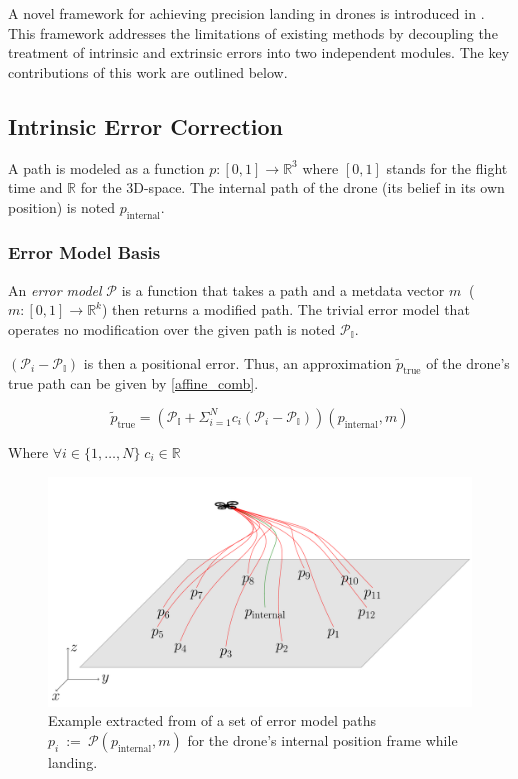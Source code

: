 \documentclass[10pt,journal,compsoc]{IEEEtran}
\begin{document}
 A novel framework for achieving precision landing in drones is introduced in \cite{studied}. This framework addresses the limitations of existing methods by decoupling the treatment of intrinsic and extrinsic errors into two independent modules. The key contributions of this work are outlined below.

\subsection{Intrinsic Error Correction}
A path is modeled as a function $p : [0,1] \to \mathbb{R}^3$ where $[0,1]$ stands for the flight time and $\mathbb{R}$ for the 3D-space. The internal path of the drone (its belief in its own position) is noted $p_{\text{internal}}$.

\subsubsection{Error Model Basis}
An \emph{error model} $\mathcal{P}$ is a function that takes a path and a metdata vector $m \:$ ($m : [0,1] \to \mathbb{R}^k$) then returns a modified path. The trivial error model that operates no modification over the given path is noted $\mathcal{P}_{\mathbb{I}}$.

$(\mathcal{P}_i - \mathcal{P}_{\mathbb{I}})$ is then a positional error. Thus, an approximation $\tilde{p}_{\text{true}}$ of the drone's true path can be given by \eqref{affine_comb}.

\begin{equation}\label{affine_comb}
    \tilde{p}_{\text{true}}=(\mathcal{P}_{\mathbb{I}} + \Sigma_{i=1}^{N} c_i (\mathcal{P}_i - \mathcal{P}_{\mathbb{I}}))(p_{\text{internal}}, m)
\end{equation}

Where $\forall i\in \{1, \dots, N\} \; c_i \in \mathbb{R}$

\begin{figure}[h]
    \centering
    \includegraphics[width=1\linewidth]{rsc/set_error_model_paths.png}
    \caption{Example extracted from \cite{studied} of a set of error model paths $p_i~:=~\mathcal{P}(p_{\text{internal}}, m)$ for the drone’s internal position frame while landing.}
    \label{fig:enter-label}
\end{figure}
\end{document}
